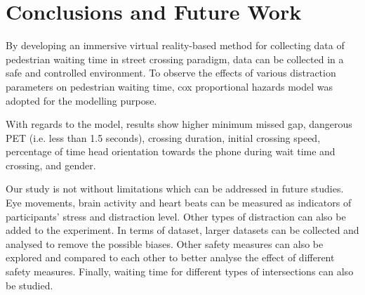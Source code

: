 \section{Conclusions and Future Work}
\label{S:D7}
By developing an immersive virtual reality-based method for collecting data of pedestrian waiting time in street crossing paradigm, data can be collected in a safe and controlled environment. To observe the effects of various distraction parameters on pedestrian waiting time, cox proportional hazards model was adopted for the modelling purpose. 

With regards to the model, results show higher minimum missed gap, dangerous PET (i.e. less than 1.5 seconds), crossing duration, initial crossing speed, percentage of time head orientation towards the phone during wait time and crossing, and gender. 

Our study is not without limitations which can be addressed in future studies. Eye movements, brain activity and heart beats can be measured as indicators of participants’ stress and distraction level. Other types of distraction can also be added to the experiment. In terms of dataset, larger datasets can be collected and analysed to remove the possible biases. Other safety measures can also be explored and compared to each other to better analyse the effect of different safety measures. Finally, waiting time for different types of intersections can also be studied.

